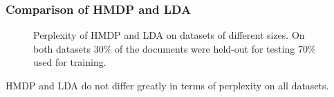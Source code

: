 \subsubsection{Comparison of HMDP and LDA}
\begin{figure}[H]%
\centering
{}%
\qquad
{}%
\caption{Perplexity of HMDP and LDA on datasets of different sizes. On both datasets 30\% of the documents were held-out for testing 70\% used for training.}
\end{figure}
HMDP and LDA do not differ greatly in terms of perplexity on all datasets.
